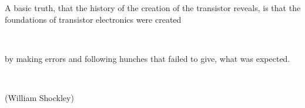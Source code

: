 \vspace*{\fill} 
\begin{center}
    \begin{LARGE}
		  \glqq A basic truth, that the history of the creation of the transistor reveals, is that the foundations of transistor electronics were created
    \end{LARGE}\\
    \begin{LARGE}
		   by making errors and following hunches that failed to give, what was expected.\grqq
    \end{LARGE}\\
    \begin{large}
      (William Shockley)
    \end{large}
\end{center}
\vspace*{\fill}
